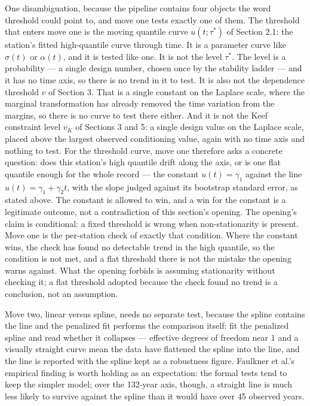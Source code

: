 \documentclass[11pt]{article}
\begin{document}
{One disambiguation, because the pipeline contains {\color{green}four} objects the word threshold could point to, and move one tests exactly one of them. The threshold that enters move one is the moving quantile curve $u(t; \tau^{*})$ of Section 2.1: the station's fitted high-quantile curve through time. It is a parameter curve like $\sigma(t)$ or $\alpha(t)$, and it is tested like one. It is not the level $\tau^{*}$. The level is a probability — a single design number, chosen once by the stability ladder — and it has no time axis, so there is no trend in it to test. It is also not the dependence threshold $v$ of Section 3. That is a single constant on the {\color{green}Laplace} scale, where the marginal transformation has already removed the time variation from the margins, so there is no curve to test there either. {\color{green}And it is not the Keef constraint level $v_K$ of Sections 3 and 5: a single design value on the Laplace scale, placed above the largest observed conditioning value, again with no time axis and nothing to test.} For the threshold curve, move one therefore asks a concrete question: does this station's high quantile drift along the axis, or is one flat quantile enough for the whole record — the constant $u(t) = \gamma_1$ against the line $u(t) = \gamma_1 + \gamma_2 t$, with the slope judged against its bootstrap standard error, as stated above. The constant is allowed to win, and a win for the constant is a legitimate outcome, not a contradiction of this section's opening. The opening's claim is conditional: a fixed threshold is wrong when non-stationarity is present. Move one is the per-station check of exactly that condition. Where the constant wins, the check has found no detectable trend in the high quantile, so the condition is not met, and a flat threshold there is not the mistake the opening warns against. What the opening forbids is assuming stationarity without checking it; a flat threshold adopted because the check found no trend is a conclusion, not an assumption.
}

Move two, linear versus spline, needs no separate test, because the spline contains the line and the penalized fit performs the comparison itself: fit the penalized spline and read whether it collapses --- effective degrees of freedom near 1 and a visually straight curve mean the data have flattened the spline into the line, and the line is reported with the spline kept as a robustness figure. Faulkner et al.'s empirical finding is worth holding as an expectation: the formal tests tend to keep the simpler model; over the 132-year axis, though, a straight line is much less likely to survive against the spline than it would have over 45 observed years.
\end{document}
